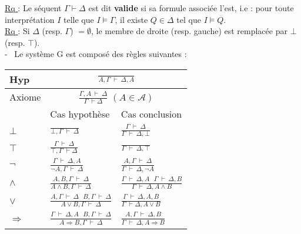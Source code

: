 \documentclass[11pt,a4paper]{article}
\begin{document}
\underline{Rq }: Le séquent $\Gamma \vdash \Delta$ est dit \textbf{valide} si sa formule associée l'est, i.e : pour toute interprétation $I$ telle que $I \models \Gamma$, il existe $Q\in \Delta$ tel que $I \models Q$.\\
\underline{Rq }: Si $\Delta$ (resp. $\Gamma$) $= \emptyset$, le membre de droite (resp. gauche) est remplacée par $\bot$ (resp. $\top$). \\

- \ Le système G est composé des règles suivantes : \\

\begin{tabular}{|C{3cm}|C{6cm}|C{7cm}|}
  \hline
  Hyp &   \\
  \hline
  Axiome &   \\
  \hline
  & Cas hypothèse & Cas conclusion \\
  \hline
  $\bot$ & {\Large $\frac{}{\bot , \Gamma \ \vdash \ \Delta}$} & {\Large $\frac{\Gamma \ \vdash \ \Delta}{\Gamma \ \vdash \ \Delta, \bot}$} \\
  \hline
  $\top$ & {\Large $\frac{\Gamma \ \vdash \ \Delta}{\top,\Gamma \ \vdash \Delta}$} & {\Large $\frac{}{\Gamma \ \vdash \ \Delta, \top}$}  \\
  \hline
  $\lnot$ & {\Large $\frac{\Gamma \  \vdash \ \Delta,A  }{\lnot A,\Gamma \  \vdash \ \Delta}$}  & {\Large $\frac{A,\Gamma \ \vdash \ \Delta}{\Gamma \  \vdash \ \Delta, \lnot A }$} \\
  \hline
  $\land$ & {\Large $\frac{A,B,\Gamma \ \vdash \ \Delta}{A\land B, \Gamma \ \vdash \ \Delta}$} & {\Large $\frac{\Gamma \  \vdash \ \Delta,A \ \ \ \Gamma \ \vdash \ \Delta, B }{\Gamma \  \vdash \ \Delta, A\land B }$} \\
  \hline
  $\lor$ & {\Large $\frac{A,\Gamma \  \vdash \ \Delta \ \ \ B,\Gamma \ \vdash \ \Delta}{A\lor B,\Gamma \  \vdash \ \Delta }$} & {\Large $\frac{\Gamma \  \vdash \ \Delta,A,B}{\Gamma \  \vdash \Delta,A\lor B  }$} \\
  \hline
  $\Rightarrow$ & {\Large $\frac{\Gamma \  \vdash \ \Delta,A	 \ \ \ B,\Gamma \ \vdash \ \Delta}{A \Rightarrow B,\Gamma \  \vdash \ \Delta}$} & {\Large $\frac{A,\Gamma \  \vdash \ \Delta,B}{\Gamma \  \vdash \ \Delta,A \Rightarrow B}$} \\
  \hline
\end{tabular}
\\
\\
\end{document}
